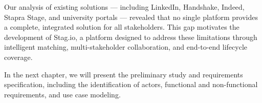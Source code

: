 Our analysis of existing solutions --- including LinkedIn, Handshake, Indeed, Stapra Stage, and university portals --- revealed that no single platform provides a complete, integrated solution for all stakeholders. This gap motivates the development of Stag.io, a platform designed to address these limitations through intelligent matching, multi-stakeholder collaboration, and end-to-end lifecycle coverage.

In the next chapter, we will present the preliminary study and requirements specification, including the identification of actors, functional and non-functional requirements, and use case modeling.
